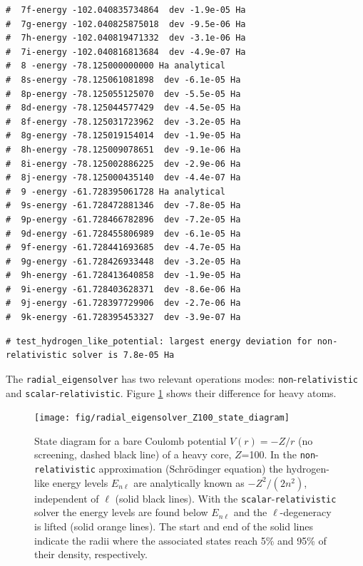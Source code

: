 \documentclass[oribibl]{llncs}
\newcommand{\ttt}[1]{\texttt{#1}}
\begin{document}
\begin{landscape}
\begin{minipage}[t]{.7\textwidth}
\begin{verbatim}
#  7f-energy -102.040835734864  dev -1.9e-05 Ha
#  7g-energy -102.040825875018  dev -9.5e-06 Ha
#  7h-energy -102.040819471332  dev -3.1e-06 Ha
#  7i-energy -102.040816813684  dev -4.9e-07 Ha
#  8 -energy -78.125000000000 Ha analytical
#  8s-energy -78.125061081898  dev -6.1e-05 Ha
#  8p-energy -78.125055125070  dev -5.5e-05 Ha
#  8d-energy -78.125044577429  dev -4.5e-05 Ha
#  8f-energy -78.125031723962  dev -3.2e-05 Ha
#  8g-energy -78.125019154014  dev -1.9e-05 Ha
#  8h-energy -78.125009078651  dev -9.1e-06 Ha
#  8i-energy -78.125002886225  dev -2.9e-06 Ha
#  8j-energy -78.125000435140  dev -4.4e-07 Ha
#  9 -energy -61.728395061728 Ha analytical
#  9s-energy -61.728472881346  dev -7.8e-05 Ha
#  9p-energy -61.728466782896  dev -7.2e-05 Ha
#  9d-energy -61.728455806989  dev -6.1e-05 Ha
#  9f-energy -61.728441693685  dev -4.7e-05 Ha
#  9g-energy -61.728426933448  dev -3.2e-05 Ha
#  9h-energy -61.728413640858  dev -1.9e-05 Ha
#  9i-energy -61.728403628371  dev -8.6e-06 Ha
#  9j-energy -61.728397729906  dev -2.7e-06 Ha
#  9k-energy -61.728395453327  dev -3.9e-07 Ha
\end{verbatim}
%
\end{minipage}
%
\begin{verbatim}
# test_hydrogen_like_potential: largest energy deviation for non-relativistic solver is 7.8e-05 Ha
\end{verbatim}
\normalsize
\end{landscape}

\newpage

The \ttt{radial\_eigensolver} has two relevant operations modes: \ttt{non}-\ttt{relativistic} and \ttt{scalar}-\ttt{relativistic}. Figure \ref{fig:radial-eigensolver-Z100-state-diagram} shows their difference for heavy atoms.
\begin{figure}[t]
	\centering
	\texttt{[image: fig/radial\_eigensolver\_Z100\_state\_diagram]}
	\label{fig:radial-eigensolver-Z100-state-diagram}
	\caption{State diagram for a bare Coulomb potential $V(r) = -Z/r$ (no screening, dashed black line) 
			 of a heavy core, $Z$=100.
			 In the \ttt{non}-\ttt{relativistic} approximation (Schr\"{o}dinger equation)
			 the hydrogen-like energy levels $E_{n\ell}$ are analytically known as $-{Z^2}/({2n^2})$,
			 independent of $\ell$ (solid black lines).
			 With the \ttt{scalar}-\ttt{relativistic} solver the energy levels are found below $E_{n\ell}$
			 and the $\ell$-degeneracy is lifted (solid orange lines). The start and end of the solid lines indicate the radii where the associated states reach 5\% and 95\% of their density, respectively.
	         }
\end{figure}
\end{document}
